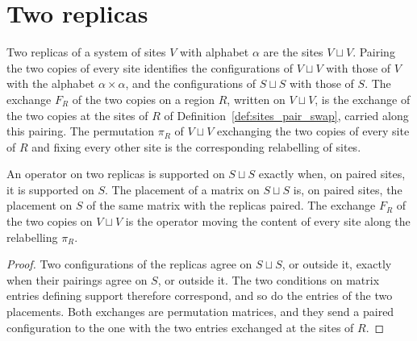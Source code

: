 \section{Two replicas}

\begin{definition}
    \label{def:sites-replica-swap}
    \leanok
    Two replicas of a system of sites $V$ with alphabet $\alpha$ are the sites
    $V\sqcup V$. Pairing the two copies of every site identifies the configurations of
    $V\sqcup V$ with those of $V$ with the alphabet $\alpha\times\alpha$, and the
    configurations of $S\sqcup S$ with those of $S$. The exchange $F_R$ of the two copies
    on a region $R$, written on $V\sqcup V$, is the exchange of the two copies at the
    sites of $R$ of Definition~\ref{def:sites_pair_swap}, carried along this pairing.
    The permutation $\pi_R$ of $V\sqcup V$ exchanging the two copies of every site of
    $R$ and fixing every other site is the corresponding relabelling of sites.
\end{definition}

\begin{theorem}
    \label{thm:sites-replica-pair-transfer}
    \leanok
    An operator on two replicas is supported on $S\sqcup S$ exactly when, on paired
    sites, it is supported on $S$. The placement of a matrix on $S\sqcup S$ is, on
    paired sites, the placement on $S$ of the same matrix with the replicas paired. The
    exchange $F_R$ of the two copies on $V\sqcup V$ is the operator moving the content
    of every site along the relabelling $\pi_R$.
\end{theorem}
\begin{proof}
    \leanok
    Two configurations of the replicas agree on $S\sqcup S$, or outside it, exactly
    when their pairings agree on $S$, or outside it. The two conditions on matrix
    entries defining support therefore correspond, and so do the entries of the two
    placements. Both exchanges are permutation matrices, and they send a paired
    configuration to the one with the two entries exchanged at the sites of $R$.
\end{proof}


